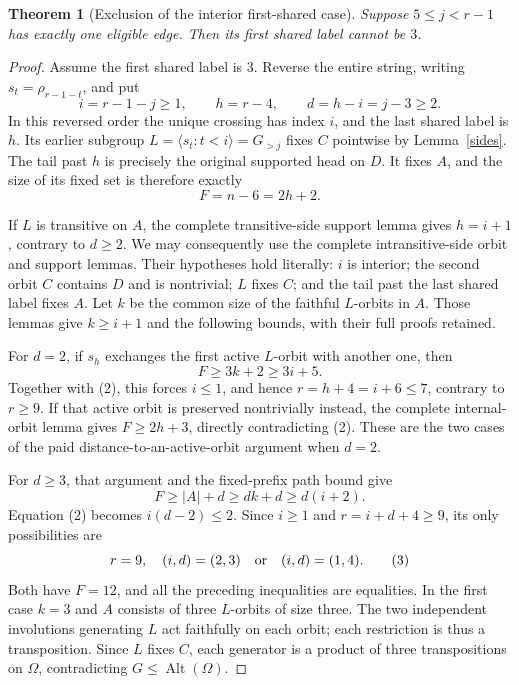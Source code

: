 \documentclass[11pt,a4paper]{article}
\newtheorem{theorem}[lemma]{Theorem}
\newcommand{\gen}[1]{\langle#1\rangle}
\newcommand{\Alt}{\operatorname{Alt}}
\begin{document}
\begin{theorem}[Exclusion of the interior first-shared case]\label{exclude}
Suppose $5\leq j<r-1$ has exactly one eligible edge.
Then its first shared label cannot be $3$.
\end{theorem}
\begin{proof}
Assume the first shared label is $3$. Reverse the entire string,
writing $s_t=\rho_{r-1-t}$, and put
\[
 i=r-1-j\geq1,\qquad h=r-4,\qquad d=h-i=j-3\geq2.
\]
In this reversed order the unique crossing has index $i$, and
the last shared label is $h$. Its earlier subgroup
$L=\gen{s_t:t<i}=G_{>j}$ fixes $C$ pointwise by Lemma~\ref{sides}.
The tail past $h$ is precisely the original supported head on $D$.
It fixes $A$, and the size of its fixed set is therefore exactly
\[
                       F=n-6=2h+2.                     \tag{2}
\]

If $L$ is transitive on $A$, the complete transitive-side support
lemma gives $h=i+1$, contrary to $d\geq2$. We may consequently
use the complete intransitive-side orbit and support lemmas.
Their hypotheses hold literally: $i$ is interior; the second
orbit $C$ contains $D$ and is nontrivial; $L$ fixes $C$;
and the tail past the last shared label fixes $A$.
Let $k$ be the common size of the faithful $L$-orbits in $A$.
Those lemmas give $k\geq i+1$ and the following bounds, with
their full proofs retained.

For $d=2$, if $s_h$ exchanges the first active $L$-orbit with
another one, then
\[
 F\geq3k+2\geq3i+5.
\]
Together with (2), this forces $i\leq1$, and hence
$r=h+4=i+6\leq7$, contrary to $r\geq9$.
If that active orbit is preserved nontrivially instead, the
complete internal-orbit lemma gives $F\geq2h+3$, directly
contradicting (2). These are the two cases of the paid
distance-to-an-active-orbit argument when $d=2$.

For $d\geq3$, that argument and the fixed-prefix path bound give
\[
 F\geq |A|+d\geq dk+d\geq d(i+2).
\]
Equation (2) becomes $i(d-2)\leq2$. Since $i\geq1$ and
$r=i+d+4\geq9$, its only possibilities are
\[
 r=9,\quad (i,d)=(2,3)\quad\hbox{or}\quad(i,d)=(1,4).   \tag{3}
\]
Both have $F=12$, and all the preceding inequalities are
equalities. In the first case $k=3$ and $A$ consists of three
$L$-orbits of size three. The two independent involutions
generating $L$ act faithfully on each orbit; each restriction
is thus a transposition. Since $L$ fixes $C$, each generator
is a product of three transpositions on $\Omega$, contradicting
$G\leq\Alt(\Omega)$.


\end{proof}
\end{document}
